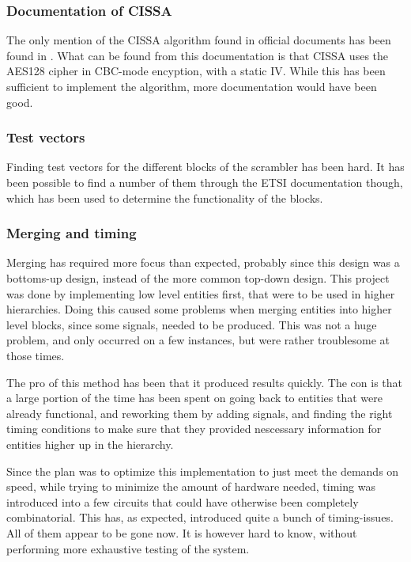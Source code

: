 \subsubsection{Documentation of CISSA}
The only mention of the CISSA algorithm found in official documents 
has been found in \citet{DVB:2013}. What can be found from this 
documentation is that CISSA uses the AES128 cipher in CBC-mode 
encyption, with a static IV. While this has been sufficient to 
implement the algorithm, more documentation would have been good.

\subsubsection{Test vectors}
Finding test vectors for the different blocks of the scrambler has 
been hard. It has been possible to find a number of them through the 
ETSI documentation though, which has been used to determine the 
functionality of the blocks.

\subsubsection{Merging and timing}
Merging has required more focus than expected, probably since this 
design was a bottoms-up design, instead of the more common top-down 
design. This project was done by implementing low level entities 
first, that were to be used in higher hierarchies. Doing this caused 
some problems when merging entities into higher level blocks, since 
some signals, needed to be produced. This was not a huge problem, and 
only occurred on a few instances, but were rather troublesome at those 
times.

The pro of this method has been that it produced results quickly. The 
con is that a large portion of the time has been spent on going back 
to entities that were already functional, and reworking them by adding 
signals, and finding the right timing conditions to make sure that 
they provided nescessary information for entities higher up in the 
hierarchy.

Since the plan was to optimize this implementation to just meet the 
demands on speed, while trying to minimize the amount of hardware 
needed, timing was introduced into a few circuits that could have 
otherwise been completely combinatorial. This has, as expected, 
introduced quite a bunch of timing-issues. All of them appear to be 
gone now. It is however hard to know, without performing more 
exhaustive testing of the system.


